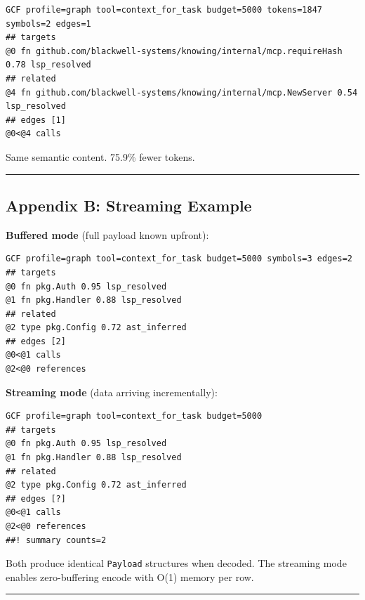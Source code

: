 \documentclass[
  11pt,
  paper=a4,
  ,captions=tableheading
]{scrartcl}
\begin{document}
\begin{verbatim}
GCF profile=graph tool=context_for_task budget=5000 tokens=1847 symbols=2 edges=1
## targets
@0 fn github.com/blackwell-systems/knowing/internal/mcp.requireHash 0.78 lsp_resolved
## related
@4 fn github.com/blackwell-systems/knowing/internal/mcp.NewServer 0.54 lsp_resolved
## edges [1]
@0<@4 calls
\end{verbatim}

Same semantic content. 75.9\% fewer tokens.

\begin{center}\rule{0.5\linewidth}{0.5pt}\end{center}

\subsection{Appendix B: Streaming
Example}\label{appendix-b-streaming-example}

\textbf{Buffered mode} (full payload known upfront):

\begin{verbatim}
GCF profile=graph tool=context_for_task budget=5000 symbols=3 edges=2
## targets
@0 fn pkg.Auth 0.95 lsp_resolved
@1 fn pkg.Handler 0.88 lsp_resolved
## related
@2 type pkg.Config 0.72 ast_inferred
## edges [2]
@0<@1 calls
@2<@0 references
\end{verbatim}

\textbf{Streaming mode} (data arriving incrementally):

\begin{verbatim}
GCF profile=graph tool=context_for_task budget=5000
## targets
@0 fn pkg.Auth 0.95 lsp_resolved
@1 fn pkg.Handler 0.88 lsp_resolved
## related
@2 type pkg.Config 0.72 ast_inferred
## edges [?]
@0<@1 calls
@2<@0 references
##! summary counts=2
\end{verbatim}

Both produce identical \texttt{Payload} structures when decoded. The
streaming mode enables zero-buffering encode with O(1) memory per row.

\begin{center}\rule{0.5\linewidth}{0.5pt}\end{center}
\end{document}
